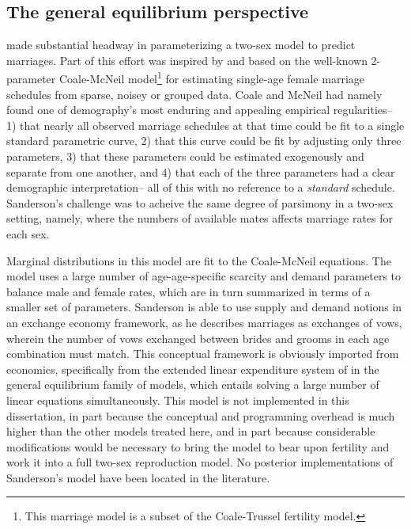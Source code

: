 \subsection{The general equilibrium perspective} 
\citet{marriage1981warren,
sanderson1983two} made substantial headway in parameterizing a two-sex model to predict marriages. Part of this effort was
inspired by and based on the well-known 2-parameter Coale-McNeil
model\citep{coale1972distribution, coale1971age}\footnote{This marriage model is
a subset of the Coale-Trussel fertility model.} for estimating
single-age female marriage schedules from sparse, noisey or grouped
data. Coale and McNeil had namely found one of demography's most enduring 
and appealing empirical regularities-- 1) that nearly 
all observed marriage schedules at that time could be fit to a single standard parametric
curve, 2) that this curve could be fit by adjusting only three parameters, 3)
that these parameters could be estimated exogenously and separate from one
another, and 4) that each of the three parameters had a clear demographic
interpretation-- all of this with no reference to a \textit{standard}
schedule. Sanderson's challenge was to acheive the same degree of parsimony in a
two-sex setting, namely, where the numbers of available mates affects marriage
rates for each sex. 

Marginal distributions in this model are fit to the
Coale-McNeil equations. The model uses a large number of
age-age-specific scarcity and demand parameters to balance male and female
rates, which are in turn summarized in terms of a smaller set of parameters.
Sanderson is able to use supply and demand notions in an exchange economy
framework, as he describes marriages as exchanges of vows, wherein the number
of vows exchanged between brides and grooms in each age combination must
match. This conceptual framework is obviously imported from economics,
specifically from the extended linear expenditure system of
\citet{lluch1977patterns} in the general equilibrium family of models, which entails solving a large number of linear
equations simultaneously. This model is not implemented in this dissertation, 
in part because the conceptual and programming overhead is much higher
than the other models treated here, and in part because considerable
modifications would be necessary to bring the model to bear upon fertility and
work it into a full two-sex reproduction model. No posterior implementations of
Sanderson's model have been located in the literature.

